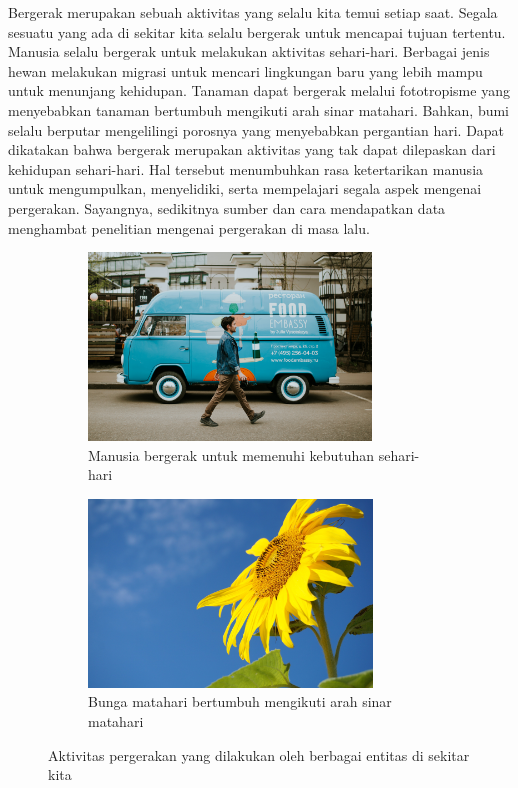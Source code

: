 \documentclass[a4paper,twoside]{article}
\begin{document}
Bergerak merupakan sebuah aktivitas yang selalu kita temui setiap saat. Segala sesuatu yang ada di sekitar kita selalu bergerak untuk mencapai tujuan tertentu. Manusia selalu bergerak untuk melakukan aktivitas sehari-hari. Berbagai jenis hewan melakukan migrasi untuk mencari lingkungan baru yang lebih mampu untuk menunjang kehidupan. Tanaman dapat bergerak melalui fototropisme yang menyebabkan tanaman bertumbuh mengikuti arah sinar matahari. Bahkan, bumi selalu berputar mengelilingi porosnya yang menyebabkan pergantian hari. Dapat dikatakan bahwa bergerak merupakan aktivitas yang tak dapat dilepaskan dari kehidupan sehari-hari. Hal tersebut menumbuhkan rasa ketertarikan manusia untuk mengumpulkan, menyelidiki, serta mempelajari segala aspek mengenai pergerakan. Sayangnya, sedikitnya sumber dan cara mendapatkan data menghambat penelitian mengenai pergerakan di masa lalu.

\iffalse

\begin{figure}[h]
    \centering
    \begin{subfigure}[b]{0.45\textwidth}
        \includegraphics[width=\textwidth, height=5cm]{Gambar/bergerak.jpg}
        \caption{Manusia bergerak untuk memenuhi kebutuhan sehari-hari\protect\footnotemark}
        \label{bab1:manusia}
    \end{subfigure}
    \begin{subfigure}[b]{0.45\textwidth}
        \includegraphics[width=\textwidth, height=5cm]{Gambar/sunflower.jpg}
        \caption{Bunga matahari bertumbuh mengikuti arah sinar matahari\protect\footnotemark}
        \label{bab1:sunflower}
    \end{subfigure}
    \caption[Aktivitas pergerakan]{
    Aktivitas pergerakan yang dilakukan oleh berbagai entitas di sekitar kita}
    \label{bab1:pergerakan}
\end{figure}
\end{document}
